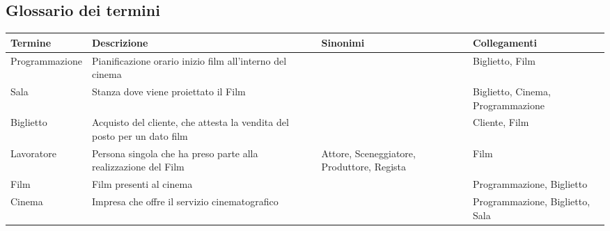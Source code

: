 \documentclass[10pt]{article}
\begin{document}
 	\subsection{Glossario dei termini}
 	\begin{tabular}{ |p{3cm}|p{4.5cm}|p{2.5cm}|p{3cm}|  }
 		\hline
 		\rowcolor{lightgray}
 		\textbf{Termine} & \textbf{Descrizione} & \textbf{Sinonimi} & \textbf{Collegamenti} \\
 		\hline
 		Programmazione                         & Pianificazione orario inizio film all'interno del cinema                &                                                                                      & Biglietto, Film                                                             \\ \hline
 		Sala                                   & Stanza dove viene proiettato il Film                                    &                                                                                      & Biglietto, Cinema, Programmazione \\ \hline
 		Biglietto                              & Acquisto del cliente, che attesta la vendita del posto per un dato film &                                                                                      & Cliente, Film                                                               \\ \hline
 		Lavoratore                                & Persona singola che ha preso parte alla realizzazione del Film                  & Attore, Sceneggiatore, Produttore, Regista & Film                                                                        \\ \hline
 		Film                                   & Film presenti al cinema                                                 &                                                                                      & Programmazione, Biglietto        \\ \hline
 		Cinema                                   &    Impresa che offre il servizio cinematografico &                                                                                      & Programmazione, Biglietto, Sala        \\ \hline
 	\end{tabular}
\end{document}
